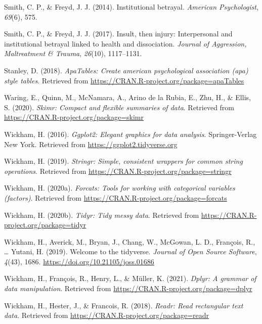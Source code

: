 \documentclass[
  english,
  man, noextraspace]{apa6}
\begin{document}
\leavevmode\hypertarget{ref-smith2014}{}%
Smith, C. P., \& Freyd, J. J. (2014). Institutional betrayal. \emph{American Psychologist}, \emph{69}(6), 575.

\leavevmode\hypertarget{ref-smith2017}{}%
Smith, C. P., \& Freyd, J. J. (2017). Insult, then injury: Interpersonal and institutional betrayal linked to health and dissociation. \emph{Journal of Aggression, Maltreatment \& Trauma}, \emph{26}(10), 1117--1131.

\leavevmode\hypertarget{ref-R-apaTables}{}%
Stanley, D. (2018). \emph{ApaTables: Create american psychological association (apa) style tables}. Retrieved from \url{https://CRAN.R-project.org/package=apaTables}

\leavevmode\hypertarget{ref-R-skimr}{}%
Waring, E., Quinn, M., McNamara, A., Arino de la Rubia, E., Zhu, H., \& Ellis, S. (2020). \emph{Skimr: Compact and flexible summaries of data}. Retrieved from \url{https://CRAN.R-project.org/package=skimr}

\leavevmode\hypertarget{ref-R-ggplot2}{}%
Wickham, H. (2016). \emph{Ggplot2: Elegant graphics for data analysis}. Springer-Verlag New York. Retrieved from \url{https://ggplot2.tidyverse.org}

\leavevmode\hypertarget{ref-R-stringr}{}%
Wickham, H. (2019). \emph{Stringr: Simple, consistent wrappers for common string operations}. Retrieved from \url{https://CRAN.R-project.org/package=stringr}

\leavevmode\hypertarget{ref-R-forcats}{}%
Wickham, H. (2020a). \emph{Forcats: Tools for working with categorical variables (factors)}. Retrieved from \url{https://CRAN.R-project.org/package=forcats}

\leavevmode\hypertarget{ref-R-tidyr}{}%
Wickham, H. (2020b). \emph{Tidyr: Tidy messy data}. Retrieved from \url{https://CRAN.R-project.org/package=tidyr}

\leavevmode\hypertarget{ref-R-tidyverse}{}%
Wickham, H., Averick, M., Bryan, J., Chang, W., McGowan, L. D., François, R., \ldots{} Yutani, H. (2019). Welcome to the tidyverse. \emph{Journal of Open Source Software}, \emph{4}(43), 1686. \url{https://doi.org/10.21105/joss.01686}

\leavevmode\hypertarget{ref-R-dplyr}{}%
Wickham, H., François, R., Henry, L., \& Müller, K. (2021). \emph{Dplyr: A grammar of data manipulation}. Retrieved from \url{https://CRAN.R-project.org/package=dplyr}

\leavevmode\hypertarget{ref-R-readr}{}%
Wickham, H., Hester, J., \& Francois, R. (2018). \emph{Readr: Read rectangular text data}. Retrieved from \url{https://CRAN.R-project.org/package=readr}

\endgroup
\end{document}
